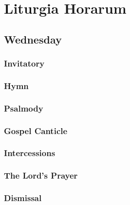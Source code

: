 




\pagestyle{fancy}

\chapter[Liturgia Horarum][Liturgia Horarum]{Liturgia Horarum}
\newpage
\section[Wednesday]{Wednesday}
\begin{english}
\subsection*{Invitatory}




\subsection*{Hymn}


\newpage \subsection*{Psalmody}


\newpage 





\subsection*{Gospel Canticle}


\subsection*{Intercessions}


\newpage \subsection*{The Lord’s Prayer}




\subsection*{Dismissal}

\end{english}

